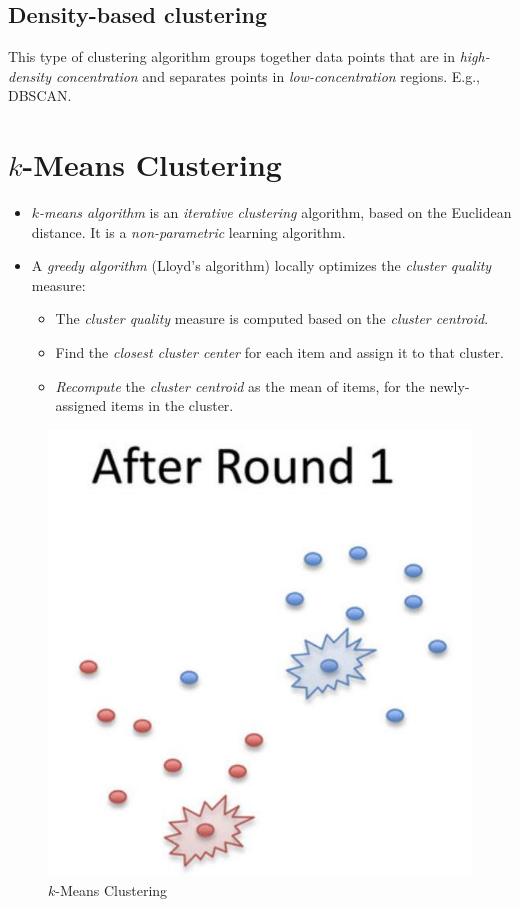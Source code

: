 \documentclass[
	number={6},
	title={Clustering}
]{cs584notes}
\begin{document}
\subsection{Density-based clustering}\label{subsec:density-based-clustering}
This type of clustering algorithm groups together data points that are in \emph{high-density concentration} and separates points in \emph{low-concentration} regions.
E.g., DBSCAN\@.

\section{$k$-Means Clustering}\label{sec:k-means-clustering}
\begin{itemize}
	\item \emph{$k$-means algorithm} is an \emph{iterative clustering} algorithm, based on the Euclidean distance.
	It is a \emph{non-parametric} learning algorithm.
	\item A \emph{greedy algorithm} (Lloyd's algorithm) locally optimizes the \emph{cluster quality} measure:
	\begin{itemize}
		\item The \emph{cluster quality} measure is computed based on the \emph{cluster centroid}.
		\item Find the \emph{closest cluster center} for each item and assign it to that cluster.
		\item \emph{Recompute} the \emph{cluster centroid} as the mean of items, for the newly-assigned items in the cluster.
	\end{itemize}
\end{itemize}

\begin{figure}[H]
	\centering
	\includegraphics[width=\textwidth]{figures/6/k_means_example}
	\caption{$k$-Means Clustering}
	\label{fig:k-means-clustering}
\end{figure} %
\end{document}
